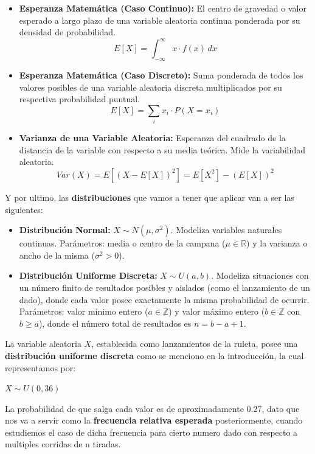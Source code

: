 \documentclass{article}
\begin{document}
\begin{itemize}
    \item \textbf{Esperanza Matemática (Caso Continuo):} El centro de gravedad o valor esperado a largo plazo de una variable aleatoria continua ponderada por su densidad de probabilidad.
    \[ E[X] = \int_{-\infty}^{\infty} x \cdot f(x) \, dx \]
    
    \item \textbf{Esperanza Matemática (Caso Discreto):} Suma ponderada de todos los valores posibles de una variable aleatoria discreta multiplicados por su respectiva probabilidad puntual.
    \[ E[X] = \sum_{i} x_i \cdot P(X = x_i) \]
    
    \item \textbf{Varianza de una Variable Aleatoria:} Esperanza del cuadrado de la distancia de la variable con respecto a su media teórica. Mide la variabilidad aleatoria.
    \[ Var(X) = E[(X - E[X])^2] = E[X^2] - (E[X])^2 \]
\end{itemize}

Y por ultimo, las \textbf{distribuciones} que vamos a tener que aplicar van a ser las siguientes:
\begin{itemize}
    \item \textbf{Distribución Normal:} $X \sim N(\mu, \sigma^2)$. Modeliza variables naturales continuas. Parámetros: media o centro de la campana ($\mu \in \mathbb{R}$) y la varianza o ancho de la misma ($\sigma^2 > 0$).
    \item \textbf{Distribución Uniforme Discreta:} $X \sim U(a, b)$. Modeliza situaciones con un número finito de resultados posibles y aislados (como el lanzamiento de un dado), donde cada valor posee exactamente la misma probabilidad de ocurrir. Parámetros: valor mínimo entero ($a \in \mathbb{Z}$) y valor máximo entero ($b \in \mathbb{Z}$ con $b \ge a$), donde el número total de resultados es $n = b - a + 1$.
\end{itemize}

La variable aleatoria \textbf{$X$}, establecida como lanzamientos de la ruleta, posee una \textbf{distribución uniforme discreta} como se menciono en la introducción, la cual representamos por: 

\begin{center}    \textbf{$X \sim U(0, 36)$}
\end{center}

La probabilidad de que salga cada valor es de aproximadamente 0.27, dato que nos va a servir como la \textbf{frecuencia relativa esperada} posteriormente, cuando estudiemos el caso de dicha frecuencia para cierto numero dado con respecto a multiples corridas de n tiradas.
\end{document}
